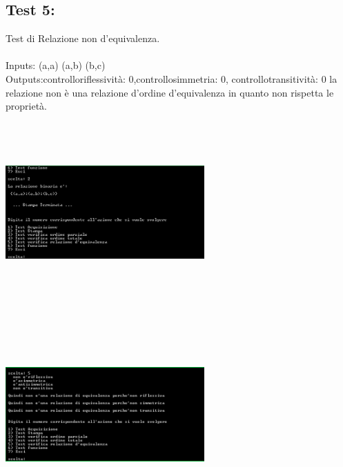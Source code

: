 \documentclass[11pt, a4paper, titlepage, block]{article}
\begin{document}
	\subsection{Test 5:}
	Test di Relazione non d'equivalenza.\\
	\\
	Inputs: (a,a) (a,b) (b,c) \\
	Outputs:controlloriflessivit\`a: 0,controllosimmetria: 0, controllotransitivit\`a: 0
	la relazione non \`e una relazione d'ordine d'equivalenza in quanto non rispetta le propriet\`a.\\
	\includegraphics[width=3in,height=3in,viewport=0 0 300 300]{../Screenshots/Test5Input.png}
	\\
	\includegraphics[width=3in,height=3in,viewport=0 0 300 300]{../Screenshots/Test5Output.png}
	\\
	\\
	\newpage
\end{document}
